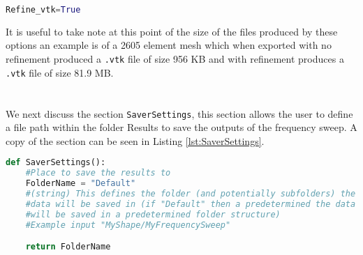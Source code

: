 \begin{lstlisting}[language=Python]
Refine_vtk=True
\end{lstlisting}
It is useful to take note at this point of the size of the files produced by these options an example is of a 2605 element mesh which when exported with no refinement produced a \texttt{.vtk} file of size 956 KB and with refinement produces a \texttt{.vtk} file of size 81.9 MB.\\
\\
\\
\noindent
We next discuss the section \texttt{SaverSettings}, this section allows the user to define a file path within the folder Results to save the outputs of the frequency sweep. A copy of the section can be seen in Listing \ref{lst:SaverSettings}.

\begin{lstlisting}[language=Python, caption={SaverSettings Definition}, label={lst:SaverSettings}]
def SaverSettings():
    #Place to save the results to
    FolderName = "Default"
    #(string) This defines the folder (and potentially subfolders) the
    #data will be saved in (if "Default" then a predetermined the data
    #will be saved in a predetermined folder structure)
    #Example input "MyShape/MyFrequencySweep"

    return FolderName
\end{lstlisting}

